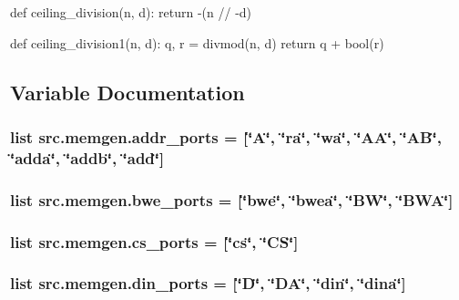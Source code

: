 def ceiling\-\_\-division(n, d)\-: return -\/(n // -\/d) 

def ceiling\-\_\-division1(n, d)\-: q, r = divmod(n, d) return q + bool(r) 

\subsection{Variable Documentation}
\hypertarget{namespacesrc_1_1memgen_a70a3f55f2a4af458e961fe8930d3a35b}{
\subsubsection[{addr\-\_\-ports}]{\setlength{\rightskip}{0pt plus 5cm}list src.\-memgen.\-addr\-\_\-ports = \mbox{[}\char`\"{}A\char`\"{}, \char`\"{}ra\char`\"{}, \char`\"{}wa\char`\"{}, \char`\"{}A\-A\char`\"{}, \char`\"{}A\-B\char`\"{}, \char`\"{}adda\char`\"{}, \char`\"{}addb\char`\"{}, \char`\"{}add\char`\"{}\mbox{]}}}\label{namespacesrc_1_1memgen_a70a3f55f2a4af458e961fe8930d3a35b}
\hypertarget{namespacesrc_1_1memgen_a9eced6c2b7295c2a54e7d38418b2e36f}{
\subsubsection[{bwe\-\_\-ports}]{\setlength{\rightskip}{0pt plus 5cm}list src.\-memgen.\-bwe\-\_\-ports = \mbox{[}\char`\"{}bwe\char`\"{}, \char`\"{}bwea\char`\"{}, \char`\"{}B\-W\char`\"{}, \char`\"{}B\-W\-A\char`\"{}\mbox{]}}}\label{namespacesrc_1_1memgen_a9eced6c2b7295c2a54e7d38418b2e36f}
\hypertarget{namespacesrc_1_1memgen_a3248ebd712c5c181fc31dc2989c6b36a}{
\subsubsection[{cs\-\_\-ports}]{\setlength{\rightskip}{0pt plus 5cm}list src.\-memgen.\-cs\-\_\-ports = \mbox{[}\char`\"{}cs\char`\"{}, \char`\"{}C\-S\char`\"{}\mbox{]}}}\label{namespacesrc_1_1memgen_a3248ebd712c5c181fc31dc2989c6b36a}
\hypertarget{namespacesrc_1_1memgen_a8857a3c36ad954416e7985d579f88ec5}{
\subsubsection[{din\-\_\-ports}]{\setlength{\rightskip}{0pt plus 5cm}list src.\-memgen.\-din\-\_\-ports = \mbox{[}\char`\"{}D\char`\"{}, \char`\"{}D\-A\char`\"{}, \char`\"{}din\char`\"{}, \char`\"{}dina\char`\"{}\mbox{]}}}\label{namespacesrc_1_1memgen_a8857a3c36ad954416e7985d579f88ec5}
